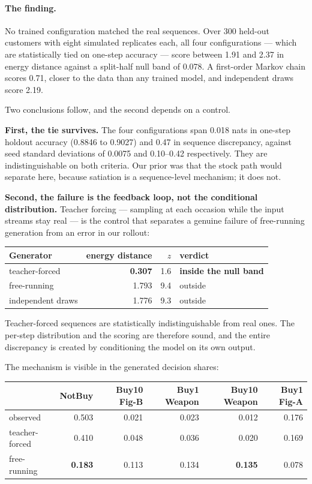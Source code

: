 \documentclass[11pt]{article}
\begin{document}
\paragraph{The finding.} No trained configuration matched the real sequences.
Over 300 held-out customers with eight simulated replicates each, all four
configurations --- which are statistically tied on one-step accuracy --- score
between 1.91 and 2.37 in energy distance against a split-half null band of
0.078. A first-order Markov chain scores 0.71, closer to the data than any
trained model, and independent draws score 2.19.

Two conclusions follow, and the second depends on a control.

\textbf{First, the tie survives.} The four configurations span 0.018 nats in
one-step holdout accuracy (0.8846 to 0.9027) and 0.47 in sequence discrepancy,
against seed standard deviations of 0.0075 and 0.10--0.42 respectively. They are indistinguishable on both criteria. Our prior
was that the stock path would separate here, because satiation is a
sequence-level mechanism; it does not.

\textbf{Second, the failure is the feedback loop, not the conditional
distribution.} Teacher forcing --- sampling at each occasion while the input
streams stay real --- is the control that separates a genuine failure of
free-running generation from an error in our rollout:

\begin{center}\small
\begin{tabular}{lrrl}
\toprule
Generator & energy distance & $z$ & verdict \\
\midrule
teacher-forced & \textbf{0.307} & 1.6 & \textbf{inside the null band} \\
free-running & 1.793 & 9.4 & outside \\
independent draws & 1.776 & 9.3 & outside \\
\bottomrule
\end{tabular}
\end{center}

\noindent Teacher-forced sequences are statistically indistinguishable from real
ones. The per-step distribution and the scoring are therefore sound, and the
entire discrepancy is created by conditioning the model on its own output.

The mechanism is visible in the generated decision shares:

\begin{center}\small
\begin{tabular}{lrrrrr}
\toprule
& NotBuy & Buy10 Fig-B & Buy1 Weapon & Buy10 Weapon & Buy1 Fig-A \\
\midrule
observed & 0.503 & 0.021 & 0.023 & 0.012 & 0.176 \\
teacher-forced & 0.410 & 0.048 & 0.036 & 0.020 & 0.169 \\
free-running & \textbf{0.183} & 0.113 & 0.134 & \textbf{0.135} & 0.078 \\
\bottomrule
\end{tabular}
\end{center}
\end{document}
